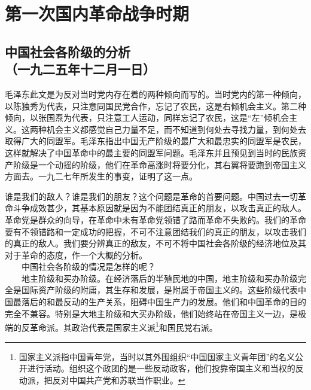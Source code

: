 \documentclass[cn,11pt,chinese]{elegantbook}
\def\myformat#1{\hfil\hfil #1}
\begin{document}
\chapter*{第一次国内革命战争时期}\newpage\section*{\myformat{中国社会各阶级的分析}\\\myformat{（一九二五年十二月一日）}}
\begin{introduction}\item 毛泽东此文是为反对当时党内存在着的两种倾向而写的。当时党内的第一种倾向，以陈独秀为代表，只注意同国民党合作，忘记了农民，这是右倾机会主义。第二种倾向，以张国焘为代表，只注意工人运动，同样忘记了农民，这是“左”倾机会主义。这两种机会主义都感觉自己力量不足，而不知道到何处去寻找力量，到何处去取得广大的同盟军。毛泽东指出中国无产阶级的最广大和最忠实的同盟军是农民，这样就解决了中国革命中的最主要的同盟军问题。毛泽东并且预见到当时的民族资产阶级是一个动摇的阶级，他们在革命高涨时将要分化，其右翼将要跑到帝国主义方面去。一九二七年所发生的事变，证明了这一点。\end{introduction}
谁是我们的敌人？谁是我们的朋友？这个问题是革命的首要问题。中国过去一切革命斗争成效甚少，其基本原因就是因为不能团结真正的朋友，以攻击真正的敌人。革命党是群众的向导，在革命中未有革命党领错了路而革命不失败的。我们的革命要有不领错路和一定成功的把握，不可不注意团结我们的真正的朋友，以攻击我们的真正的敌人。我们要分辨真正的敌友，不可不将中国社会各阶级的经济地位及其对于革命的态度，作一个大概的分析。\\
　　中国社会各阶级的情况是怎样的呢？\\
　　地主阶级和买办阶级。在经济落后的半殖民地的中国，地主阶级和买办阶级完全是国际资产阶级的附庸，其生存和发展，是附属于帝国主义的。这些阶级代表中国最落后的和最反动的生产关系，阻碍中国生产力的发展。他们和中国革命的目的完全不兼容。特别是大地主阶级和大买办阶级，他们始终站在帝国主义一边，是极端的反革命派。其政治代表是国家主义派\footnote[1]{ 国家主义派指中国青年党，当时以其外围组织“中国国家主义青年团”的名义公开进行活动。组织这个政团的是一些反动政客，他们投靠帝国主义和当权的反动派，把反对中国共产党和苏联当作职业。}和国民党右派。\\
\end{document}
